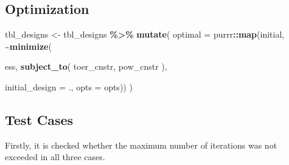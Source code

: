 \documentclass[
]{book}
\newenvironment{Shaded}{\begin{snugshade}}{\end{snugshade}}
\newcommand{\DataTypeTok}[1]{\textcolor[rgb]{0.13,0.29,0.53}{#1}}
\newcommand{\KeywordTok}[1]{\textcolor[rgb]{0.13,0.29,0.53}{\textbf{#1}}}
\newcommand{\NormalTok}[1]{#1}
\newcommand{\OperatorTok}[1]{\textcolor[rgb]{0.81,0.36,0.00}{\textbf{#1}}}
\newcommand{\StringTok}[1]{\textcolor[rgb]{0.31,0.60,0.02}{#1}}
\begin{document}
\hypertarget{optimization-6}{%
\subsection{Optimization}\label{optimization-6}}

\begin{Shaded}
\begin{Highlighting}[]
\NormalTok{tbl\_designs \textless{}{-}}\StringTok{ }\NormalTok{tbl\_designs }\OperatorTok{\%\textgreater{}\%}\StringTok{ }
\StringTok{    }\KeywordTok{mutate}\NormalTok{(}
       \DataTypeTok{optimal =}\NormalTok{ purrr}\OperatorTok{::}\KeywordTok{map}\NormalTok{(initial, }\OperatorTok{\textasciitilde{}}\KeywordTok{minimize}\NormalTok{(}
         
\NormalTok{          ess,}
          \KeywordTok{subject\_to}\NormalTok{(}
\NormalTok{              toer\_cnstr,}
\NormalTok{              pow\_cnstr}
\NormalTok{          ),}
          
          \DataTypeTok{initial\_design =}\NormalTok{ ., }
          \DataTypeTok{opts           =}\NormalTok{ opts)) )}
\end{Highlighting}
\end{Shaded}

\hypertarget{test-cases-7}{%
\subsection{Test Cases}\label{test-cases-7}}

Firstly, it is checked whether the maximum number of iterations was
not exceeded in all three cases.

\begin{Shaded}
\end{Shaded}
\end{document}
